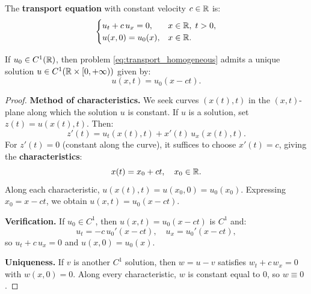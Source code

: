 \begin{definition}
The \textbf{transport equation} with constant velocity $c \in \mathbb{R}$ is:
\begin{equation}\label{eq:transport_homogeneous}
    \begin{cases}
        u_t + c\, u_x = 0, & x \in \mathbb{R},\; t > 0,\\
        u(x,0) = u_0(x), & x \in \mathbb{R}.
    \end{cases}
\end{equation}
\end{definition}

\begin{theorem}
If $u_0 \in C^1(\mathbb{R})$, then problem \eqref{eq:transport_homogeneous}
admits a unique solution $u \in C^1(\mathbb{R} \times [0,+\infty))$ given by:
\begin{equation}\label{eq:transport_solution}
    \boxed{u(x,t) = u_0(x - ct).}
\end{equation}
\end{theorem}

\begin{proof}
\textbf{Method of characteristics.} We seek curves $(x(t), t)$ in the
$(x,t)$-plane along which the solution $u$ is constant. If $u$ is a
solution, set $z(t) = u(x(t), t)$. Then:
\[
    z'(t) = u_t(x(t),t) + x'(t)\, u_x(x(t),t).
\]
For $z'(t) = 0$ (constant along the curve), it suffices to choose
$x'(t) = c$, giving the \textbf{characteristics}:
\[
    x(t) = x_0 + ct, \quad x_0 \in \mathbb{R}.
\]
Along each characteristic, $u(x(t),t) = u(x_0, 0) = u_0(x_0)$.
Expressing $x_0 = x - ct$, we obtain $u(x,t) = u_0(x-ct)$.

\textbf{Verification.} If $u_0 \in C^1$, then $u(x,t) = u_0(x-ct)$
is $C^1$ and:
\[
    u_t = -c\, u_0'(x-ct), \quad u_x = u_0'(x-ct),
\]
so $u_t + c\, u_x = 0$ and $u(x,0) = u_0(x)$.

\textbf{Uniqueness.} If $v$ is another $C^1$ solution, then $w = u - v$
satisfies $w_t + c\, w_x = 0$ with $w(x,0) = 0$. Along every
characteristic, $w$ is constant equal to $0$, so $w \equiv 0$.
\end{proof}

\begin{center}
\end{center}

